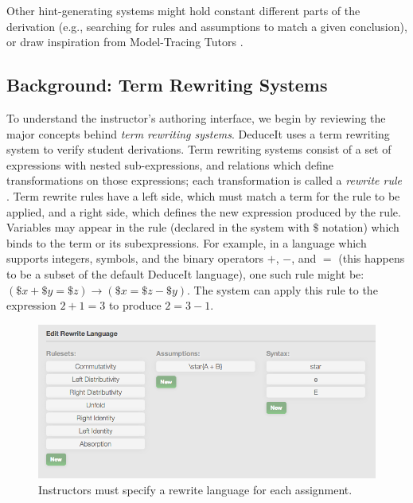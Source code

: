 \documentclass{sigchi}
\begin{document}
Other hint-generating systems might hold constant different parts of the derivation (e.g., searching for rules and assumptions to match a given conclusion), or draw inspiration from Model-Tracing Tutors \cite{MTT}.

\subsection{Background: Term Rewriting Systems}
To understand the instructor's authoring interface, we begin by reviewing the major concepts behind \textit{term rewriting systems}. DeduceIt uses a term rewriting system to verify student derivations. Term rewriting systems consist of a set of expressions with nested sub-expressions, and relations which define transformations on those expressions; each transformation is called a \textit{rewrite rule} \cite{rewriting-logic, isabelle}. Term rewrite rules have a left side, which must match a term for the rule to be applied, and a right side, which defines the new expression produced by the rule. Variables may appear in the rule (declared in the system with $\$$ notation) which binds to the term or its subexpressions. For example, in a language which supports integers, symbols, and the binary operators $+$, $-$, and $=$ (this happens to be a subset of the default DeduceIt language), one such rule might be: $(\$x+\$y=\$z) \rightarrow (\$x=\$z-\$y)$. The system can apply this rule to the expression $2+1=3$ to produce $2=3-1$.



\begin{figure}[tb]
\centering
\includegraphics[width=1\columnwidth]{rewrite_language}
\caption{Instructors must specify a rewrite language for each assignment.}
\label{fig:rewrite_language}
\end{figure}
\end{document}
